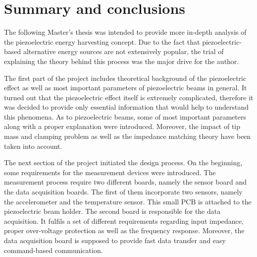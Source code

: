 \documentclass[12pt,a4paper]{article}
\begin{document}
\section{Summary and conclusions}
The following Master's thesis was intended to provide more in-depth analysis of the piezoelectric energy harvesting concept. Due to the fact that piezoelectric-based alternative energy sources are not extensively popular, the trial of explaining the theory behind this process was the major drive for the author.
\par
The first part of the project includes theoretical background of the piezoelectric effect as well as most important parameters of piezoelectric beams in general. It turned out that the piezoelectric effect itself is extremely complicated, therefore it was decided to provide only essential information that would help to understand this phenomena. As to piezoelectric beams, some of most important parameters along with a proper explanation were introduced. Moreover, the impact of tip mass and clamping problem as well as the impedance matching theory have been taken into account.
\par
The next section of the project initiated the design process. On the beginning, some requirements for the measurement devices were introduced. The measurement process require two different boards, namely the sensor board and the data acquisition boards. The first of them incorporate two sensors, namely the accelerometer and the temperature sensor. This small PCB is  attached to the piezoelectric beam holder. The second board is responsible for the data acquisition. It fulfils a set of different requirements regarding input impedance, proper over-voltage protection as well as the frequency response. Moreover, the data acquisition board is supposed to provide fast data transfer and easy command-based communication.
\par
\end{document}
